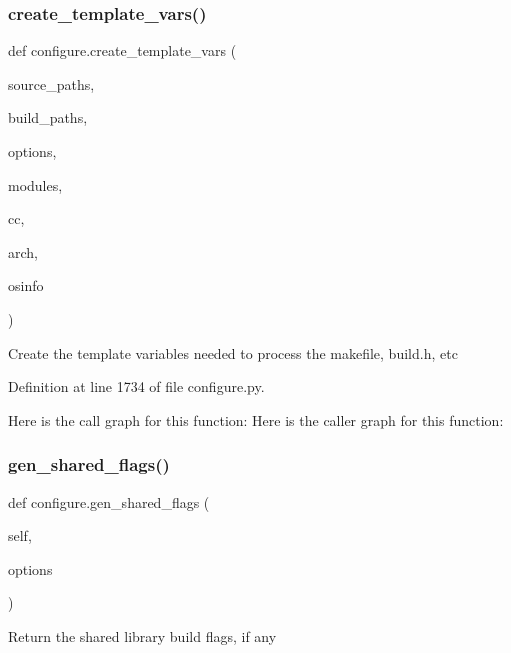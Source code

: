 \mbox{\label{namespaceconfigure_a5cddf00194b4c5daec9d4fd96c4d1fc7}} 
\subsubsection{\texorpdfstring{create\+\_\+template\+\_\+vars()}{create\_template\_vars()}}
{\footnotesize\ttfamily def configure.\+create\+\_\+template\+\_\+vars (\begin{DoxyParamCaption}\item[{}]{source\+\_\+paths,  }\item[{}]{build\+\_\+paths,  }\item[{}]{options,  }\item[{}]{modules,  }\item[{}]{cc,  }\item[{}]{arch,  }\item[{}]{osinfo }\end{DoxyParamCaption})}

\begin{DoxyVerb}Create the template variables needed to process the makefile, build.h, etc
\end{DoxyVerb}
 

Definition at line 1734 of file configure.\+py.

Here is the call graph for this function\+:
Here is the caller graph for this function\+:
\mbox{\label{namespaceconfigure_ade098de41c945183bca8df2789f0b8b6}} 
\subsubsection{\texorpdfstring{gen\+\_\+shared\+\_\+flags()}{gen\_shared\_flags()}}
{\footnotesize\ttfamily def configure.\+gen\+\_\+shared\+\_\+flags (\begin{DoxyParamCaption}\item[{}]{self,  }\item[{}]{options }\end{DoxyParamCaption})}

\begin{DoxyVerb}Return the shared library build flags, if any
\end{DoxyVerb}
 

